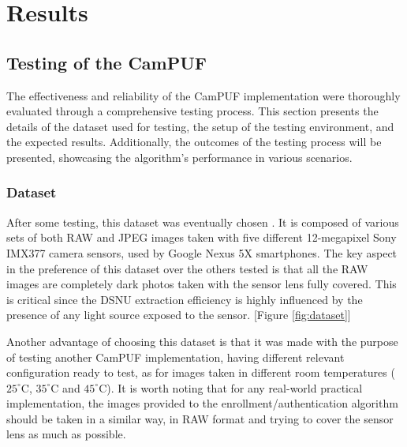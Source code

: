 \chapter{Results}\label{sec:results}

\section{Testing of the CamPUF}
The effectiveness and reliability of the CamPUF implementation were thoroughly evaluated through a comprehensive testing process. This section presents the details of the dataset used for testing, the setup of the testing environment, and the expected results. Additionally, the outcomes of the testing process will be presented, showcasing the algorithm's performance in various scenarios.

\subsection{Dataset}\label{sec:dataset}
After some testing, this dataset was eventually chosen \cite{dataset}. It is composed of various sets of both RAW and JPEG images taken with five different 12-megapixel Sony IMX377 camera sensors, used by Google Nexus 5X smartphones. The key aspect in the preference of this dataset over the others tested is that all the RAW images are completely dark photos taken with the sensor lens fully covered. This is critical since the DSNU extraction efficiency is highly influenced by the presence of any light source exposed to the sensor. [Figure \ref{fig:dataset}]

Another advantage of choosing this dataset is that it was made with the purpose of testing another CamPUF implementation, having different relevant configuration ready to test, as for images taken in different room temperatures ($25^{\circ}$C, $35^{\circ}$C and $45^{\circ}$C). It is worth noting that for any real-world practical implementation, the images provided to the enrollment/authentication algorithm should be taken in a similar way, in RAW format and trying to cover the sensor lens as much as possible.

